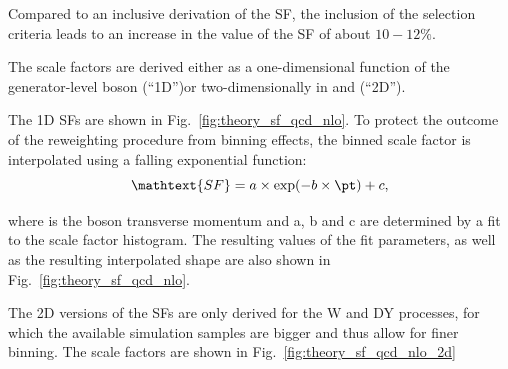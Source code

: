 Compared to an inclusive derivation of the SF, the inclusion of the selection criteria leads to an increase in the value of the SF of about $10-12\%$.


The scale factors are derived either as a one-dimensional function of the generator-level boson \ptv (``1D'')or two-dimensionally in \ptv and \mjj (``2D'').

The 1D SFs are shown in Fig.~\ref{fig:theory_sf_qcd_nlo}. To protect the outcome of the reweighting procedure from binning effects, the binned scale factor is interpolated using a falling exponential function:
\begin{equation}
\mathtext{SF} = a\times \exp(-b\times\pt) + c,
\end{equation}

where \pt is the boson transverse momentum and a, b and c are determined by a fit to the scale factor histogram. The resulting values of the fit parameters, as well as the resulting interpolated shape are also shown in Fig.~\ref{fig:theory_sf_qcd_nlo}.

The 2D versions of the SFs are only derived for the W and DY processes, for which the available simulation samples are bigger and thus allow for finer binning. The scale factors are shown in Fig.~\ref{fig:theory_sf_qcd_nlo_2d}



